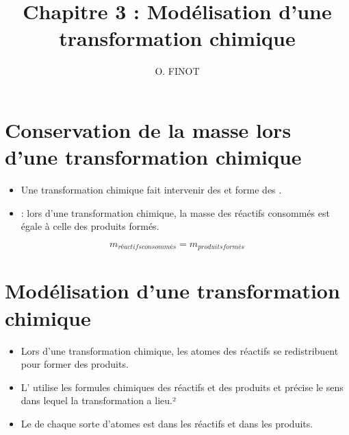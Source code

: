 \documentclass[xcolor={dvipsnames}]{beamer}
\title{Chapitre 3 : Modélisation d'une transformation chimique}
\author{O. FINOT}\institute{Collège S$^t$ Bernard}
\begin{document}
\begin{frame}
  \titlepage 
\end{frame}

\section{Conservation de la masse lors d'une transformation chimique}


%	
\begin{frame}

	\begin{alertblock}{}
		\begin{itemize}
			\item Une transformation chimique fait intervenir des  et forme des .
			\item {} : lors d'une transformation chimique, la masse des réactifs consommés est égale à celle des produits formés. \pause
		\end{itemize}
		  
		  \begin{center}
		  	\begin{equation*}
		  		m_{réactifs consommés} = m_{produits formés} 
		  	\end{equation*}
		  \end{center}
	
		
	\end{alertblock}
\end{frame}


\section{Modélisation d'une transformation chimique}
\begin{frame}
	\begin{alertblock}{}
		\begin{itemize}
			\item Lors d'une transformation chimique, les atomes des réactifs se redistribuent pour former des produits.\pause
			\item L' utilise les formules chimiques des réactifs et des produits et précise le sens dans lequel la transformation a lieu.\pause²
			\item Le  de chaque sorte d'atomes est  dans les réactifs et dans les produits. 
		\end{itemize}
	\end{alertblock}
\end{frame}
\end{document}
